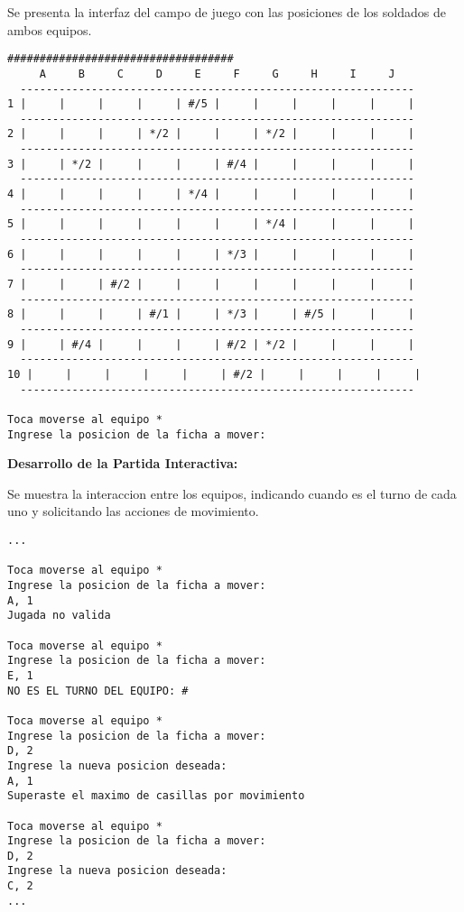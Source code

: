 Se presenta la interfaz del campo de juego con las posiciones de los soldados de ambos equipos.
\begin{lstlisting}
###################################
     A     B     C     D     E     F     G     H     I     J
  -------------------------------------------------------------
1 |     |     |     |     | #/5 |     |     |     |     |     |
  -------------------------------------------------------------
2 |     |     |     | */2 |     |     | */2 |     |     |     |
  -------------------------------------------------------------
3 |     | */2 |     |     |     | #/4 |     |     |     |     |
  -------------------------------------------------------------
4 |     |     |     |     | */4 |     |     |     |     |     |
  -------------------------------------------------------------
5 |     |     |     |     |     |     | */4 |     |     |     |
  -------------------------------------------------------------
6 |     |     |     |     |     | */3 |     |     |     |     |
  -------------------------------------------------------------
7 |     |     | #/2 |     |     |     |     |     |     |     |
  -------------------------------------------------------------
8 |     |     |     | #/1 |     | */3 |     | #/5 |     |     |
  -------------------------------------------------------------
9 |     | #/4 |     |     |     | #/2 | */2 |     |     |     |
  -------------------------------------------------------------
10 |     |     |     |     |     | #/2 |     |     |     |     |
  -------------------------------------------------------------

Toca moverse al equipo *
Ingrese la posicion de la ficha a mover:
\end{lstlisting}

\textbf{Desarrollo de la Partida Interactiva:}

Se muestra la interaccion entre los equipos, indicando cuando es el turno de cada uno y solicitando las acciones de movimiento.
\begin{lstlisting}
...

Toca moverse al equipo *
Ingrese la posicion de la ficha a mover:
A, 1
Jugada no valida

Toca moverse al equipo *
Ingrese la posicion de la ficha a mover:
E, 1
NO ES EL TURNO DEL EQUIPO: #

Toca moverse al equipo *
Ingrese la posicion de la ficha a mover:
D, 2
Ingrese la nueva posicion deseada:
A, 1
Superaste el maximo de casillas por movimiento

Toca moverse al equipo *
Ingrese la posicion de la ficha a mover:
D, 2
Ingrese la nueva posicion deseada:
C, 2
...
\end{lstlisting}


